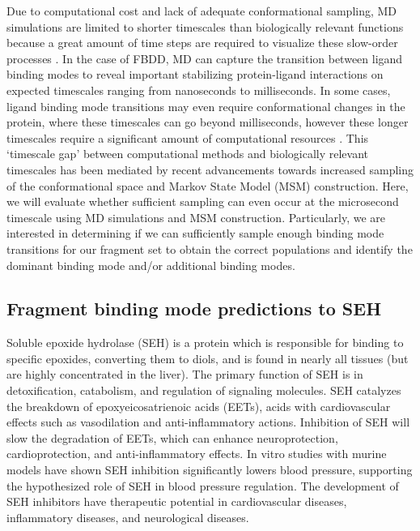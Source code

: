 Due to computational cost and lack of adequate conformational sampling, MD simulations are limited to shorter timescales than biologically relevant functions because a great amount of time steps are required to visualize these slow-order processes \cite{salmaso_bridging_2018}. 
In the case of FBDD, MD can capture the transition between ligand binding modes to reveal important stabilizing protein-ligand interactions on expected timescales ranging from nanoseconds to milliseconds.
In some cases, ligand binding mode transitions may even require conformational changes in the protein, where these timescales can go beyond milliseconds, however these longer timescales require a significant amount of computational resources  \cite{schlick_biomolecular_1997,macek_backbone_2007}.
This `timescale gap' between computational methods and biologically relevant timescales has been mediated by recent advancements towards increased sampling of the conformational space and Markov State Model (MSM) construction.
Here, we will evaluate whether sufficient sampling can even occur at the microsecond timescale using MD simulations and MSM construction.
Particularly, we are interested in determining if we can sufficiently sample enough binding mode transitions for our fragment set to obtain the correct populations and identify the dominant binding mode and/or additional binding modes.

\subsection{Fragment binding mode predictions to SEH} 
Soluble epoxide hydrolase (SEH) is a protein which is responsible for binding to specific epoxides, converting them to diols, and is found in nearly all tissues (but are highly concentrated in the liver).
The primary function of SEH is in detoxification, catabolism, and regulation of signaling molecules.
SEH catalyzes the breakdown of epoxyeicosatrienoic acids (EETs), acids with cardiovascular effects such as vasodilation and anti-inflammatory actions. 
Inhibition of SEH will slow the degradation of EETs, which can enhance neuroprotection, cardioprotection, and anti-inflammatory effects. 
In vitro studies with murine models have shown SEH inhibition significantly lowers blood pressure, supporting the hypothesized role of SEH in blood pressure regulation. 
The development of SEH inhibitors have therapeutic potential in cardiovascular diseases, inflammatory diseases, and neurological diseases. \cite{morisseau_impact_2013,morisseau_epoxide_2005,kodani_2014_2015}

